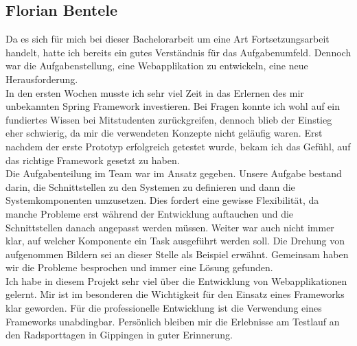 \subsection{Florian Bentele}
Da es sich für mich bei dieser Bachelorarbeit um eine Art Fortsetzungsarbeit handelt, hatte ich bereits ein gutes Verständnis für das Aufgabenumfeld. Dennoch war die Aufgabenstellung, eine Webapplikation zu entwickeln, eine neue Herausforderung.
\\

In den ersten Wochen musste ich sehr viel Zeit in das Erlernen des mir unbekannten Spring Framework investieren. Bei Fragen konnte ich wohl auf ein fundiertes Wissen bei Mitstudenten zurückgreifen, dennoch blieb der Einstieg eher schwierig, da mir die verwendeten Konzepte nicht geläufig waren. Erst nachdem der erste Prototyp erfolgreich getestet wurde, bekam ich das Gefühl, auf das richtige Framework gesetzt zu haben.
\\

Die Aufgabenteilung im Team war im Ansatz gegeben. Unsere Aufgabe bestand darin, die Schnittstellen zu den Systemen zu definieren und dann die Systemkomponenten umzusetzen. Dies fordert eine gewisse Flexibilität, da manche Probleme erst während der Entwicklung auftauchen und die Schnittstellen danach angepasst werden müssen. Weiter war auch nicht immer klar, auf welcher Komponente ein Task ausgeführt werden soll. Die Drehung von aufgenommen Bildern sei an dieser Stelle als Beispiel erwähnt. Gemeinsam haben wir die Probleme besprochen und immer eine Lösung gefunden.
\\

Ich habe in diesem Projekt sehr viel über die Entwicklung von Webapplikationen gelernt. Mir ist im besonderen die Wichtigkeit für den Einsatz eines Frameworks klar geworden. Für die professionelle Entwicklung ist die Verwendung eines Frameworks unabdingbar. Persönlich bleiben mir die Erlebnisse am Testlauf an den Radsporttagen in Gippingen in guter Erinnerung.
